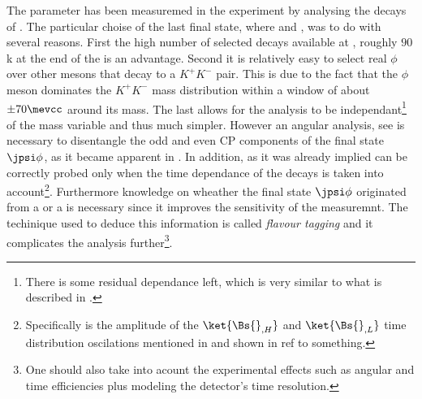 The parameter \phis has been measuremed in the \lhcb experiment by analysing the decays of .
The particular choise of the last final state, where \phiKK and \Jpsimumu, was to do with several reasons. First the high number
of selected \BsJpsiPhi decays available at \lhcb, roughly $90$k at the end of the \runtwo is an advantage. Second it is relatively easy
to select real $\phi$ over other mesons that decay to a $K^+K^-$ pair. This is due to the fact that the $\phi$ meson dominates the
$K^+K^-$ mass distribution within a window of about $\pm 70 \mevcc$ around its mass. The last allows for the analysis to be
independant\footnote{There is some residual dependance left, which is very similar to what is described in . }
of the \mkk mass variable and thus much simpler. However an angular analysis, see  is necessary
to disentangle the odd and even CP components of the final state $\jpsi\phi$, as it became apparent in .
In addition, as it was already implied \phis can be correctly probed only when the time dependance of the \BsJpsiPhi decays is taken into
account\footnote{Specifically \phis is the amplitude of the $\ket{\Bs{}_{,H}}$ and $\ket{\Bs{}_{,L}}$ time distribution oscilations
mentioned in and shown in {\color{red} ref to something.} }.
Furthermore knowledge on wheather the final state $\jpsi\phi$ originated from a \Bs or a \Bsb is necessary since it
improves the sensitivity of the \phis measuremnt. The techinique used to deduce this information is called {\it flavour tagging}
and it complicates the analysis further\footnote{One should also take into acount the experimental effects such as angular and time efficiencies plus modeling the \lhcb detector's time resolution.}.

